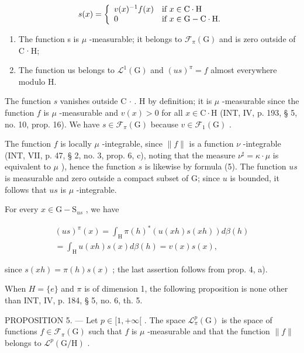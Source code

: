 \[
 s (x) = \left\{ \begin{array}{l l} v (x) ^ {- 1} f (x) & \text{if } x \in \mathrm{C} \cdot \mathrm{H} \\ 0 & \text{if } x \in \mathrm{G} - \mathrm{C} \cdot \mathrm{H}. \end{array} \right.
\]

\begin{enumerate}
\def\labelenumi{\alph{enumi})}
\item
  The function s is \(\mu\) -measurable; it belongs to \(\mathcal{F}_{\pi}(\mathrm{G})\) and is zero outside of C·H;
\item
  The function us belongs to \(\mathcal{L}^1 (\mathrm{G})\) and \((us)^{\pi} = f\) almost everywhere modulo H.
\end{enumerate}

The function \(s\) vanishes outside C \(\cdot\) . H by definition; it is \(\mu\) -measurable since the function \(f\) is \(\mu\) -measurable and \(v(x) > 0\) for all \(x \in \mathrm{C} \cdot \mathrm{H}\) (INT, IV, p. 193, § 5, no. 10, prop. 16). We have \(s \in \mathcal{F}_{\pi}(\mathrm{G})\) because \(v \in \mathcal{F}_1(\mathrm{G})\) .

The function \(f\) is locally \(\mu\) -integrable, since \(\|f\|\) is a function \(\nu\) -integrable (INT, VII, p. 47, § 2, no. 3, prop. 6, c), noting that the measure \(\nu^{\sharp} = \kappa \cdot \mu\) is equivalent to \(\mu\) ), hence the function \(s\) is likewise by formula (5). The function \(us\) is measurable and zero outside a compact subset of G; since \(u\) is bounded, it follows that \(us\) is \(\mu\) -integrable.

For every \(x\in \mathrm{G - S}_{us}\) , we have

\[
\begin{array}{c} (u s) ^ {\pi} (x) = \int_ {\mathrm{H}} \pi (h) ^ {*} (u (x h) s (x h)) d \beta (h) \\ = \int_ {\mathrm{H}} u (x h) s (x) d \beta (h) = v (x) s (x), \end{array}
\]

since \(s(xh) = \pi(h)s(x)\) ; the last assertion follows from prop. 4, a).

When \(H = \{e\}\) and \(\pi\) is of dimension 1, the following proposition is none other than INT, IV, p. 184, § 5, no. 6, th. 5.

PROPOSITION 5. --- Let \(p \in [1, +\infty[\) . The space \(\mathcal{L}_{\pi}^{p}(\mathrm{G})\) is the space of functions \(f \in \mathcal{F}_{\pi}(\mathrm{G})\) such that \(f\) is \(\mu\) -measurable and that the function \(\|f\|\) belongs to \(\mathcal{L}^{p}(\mathrm{G}/\mathrm{H})\) .

